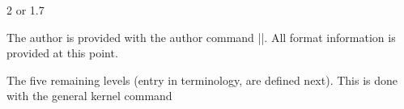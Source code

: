 \begin{teX}
\newcommand\@tocrmarg{2.55em}%
\newcommand\@dotsep{4.5}%
2 or 1.7
\end{teX}

\begin{macro}{\tableofcontents}
 The author is provided with the author command |\tableofcontents|. All format information is provided at this point.
\end{macro}

\begin{teX}
\setcounter{tocdepth}{2}
\newcommand\tableofcontents{%
    \if@twocolumn
      \@restonecoltrue\onecolumn
    \else
      \@restonecolfalse
    \fi
    \chapter*{\contentsname
        \@mkboth{%
           \MakeUppercase\contentsname}{\MakeUppercase\contentsname}}%
    \@starttoc{toc}%
    \if@restonecol\twocolumn\fi
    }
\end{teX}

\begin{teX}
\newcommand*\l@part[2]{%
  \ifnum \c@tocdepth >-2\relax
    \addpenalty{-\@highpenalty}%
    \addvspace{2.25em \@plus\p@}%
    \setlength\@tempdima{3em}%
    \begingroup
      \parindent \z@ \rightskip \@pnumwidth
      \parfillskip -\@pnumwidth
      {\leavevmode
       \large \bfseries #1\hfil \hb@xt@\@pnumwidth{\hss #2}}\par
       \nobreak
         \global\@nobreaktrue
         \everypar{\global\@nobreakfalse\everypar{}}%
    \endgroup
  \fi}

\newcommand*\l@chapter[2]{%
  \ifnum \c@tocdepth >\m@ne
    \addpenalty{-\@highpenalty}%
    \vskip 1.0em \@plus\p@
    \setlength\@tempdima{1.5em}%
    \begingroup
      \parindent \z@ \rightskip \@pnumwidth
      \parfillskip -\@pnumwidth
      \leavevmode \bfseries
      \advance\leftskip\@tempdima
      \hskip -\leftskip
      #1\nobreak\hfil \nobreak\hb@xt@\@pnumwidth{\hss #2}\par
      \penalty\@highpenalty
    \endgroup
  \fi}
\end{teX}


The five remaining levels (entry in \latex terminology, are defined next). This is done with the general \latex kernel command 

